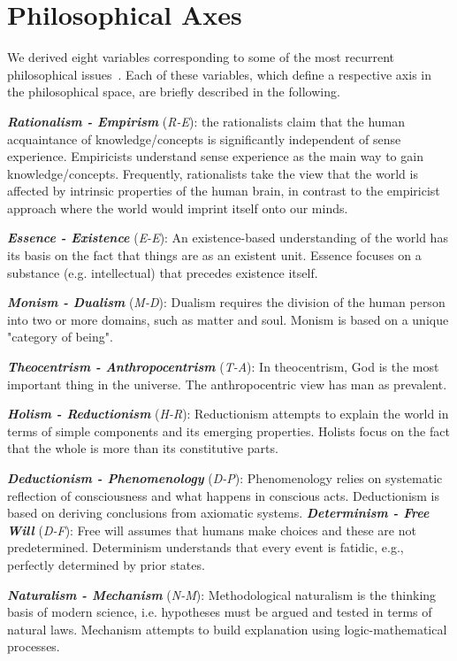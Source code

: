 \documentclass[%
 aip,
 jmp,%
 amsmath,amssymb,
 reprint,%
]{revtex4-1}
\begin{document}
\section{Philosophical Axes}
We derived eight variables corresponding to some of the most recurrent
philosophical issues~\cite{Russel,Papineau,Deleuze2}.  Each of
these variables, which define a respective axis in the philosophical
space, are briefly described in the following.

{\bf \em{ Rationalism - Empirism}} (\emph{R-E}): the rationalists
claim that the human acquaintance of knowledge/concepts is
significantly independent of sense experience. Empiricists understand
sense experience as the main way to gain knowledge/concepts.
Frequently, rationalists take the view that the world is affected by
intrinsic properties of the human brain, in contrast to the empiricist
approach where the world would imprint itself onto our minds.

{\bf \em{ Essence - Existence}} (\emph{E-E}): An existence-based
understanding of the world has its basis on the fact that things are
as an existent unit. Essence focuses on a substance
(e.g. intellectual) that precedes existence itself.

{\bf \em{ Monism - Dualism}} (\emph{M-D}): Dualism requires the
division of the human person into two or more domains, such as matter
and soul. Monism is based on a unique "category of being".

{\bf \em{ Theocentrism - Anthropocentrism}} (\emph{T-A}): In
theocentrism, God is the most important thing in the universe.  The
anthropocentric view has man as prevalent.

{\bf \em{ Holism - Reductionism}} (\emph{H-R}): Reductionism attempts
to explain the world in terms of simple components and its emerging
properties.  Holists focus on the fact that the whole is more than its
constitutive parts.

{\bf \em{ Deductionism - Phenomenology}} (\emph{D-P}): Phenomenology
relies on systematic reflection of consciousness and what happens in
conscious acts.  Deductionism is based on deriving conclusions from
axiomatic systems.  {\bf \em{ Determinism - Free Will}} (\emph{D-F}):
Free will assumes that humans make choices and these are not
predetermined.  Determinism understands that every event is fatidic,
e.g., perfectly determined by prior states.

{\bf \em{ Naturalism - Mechanism}} (\emph{N-M}): Methodological
naturalism is the thinking basis of modern science, i.e. hypotheses
must be argued and tested in terms of natural laws. Mechanism attempts
to build explanation using logic-mathematical processes.
\end{document}
